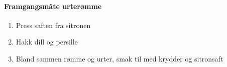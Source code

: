 \paragraph{Framgangsmåte urterømme}
\begin{enumerate}[noitemsep]
	\item Press saften fra sitronen
	\item Hakk dill og persille
	\item Bland sammen rømme og urter, smak til med krydder og sitronsaft
\end{enumerate}
